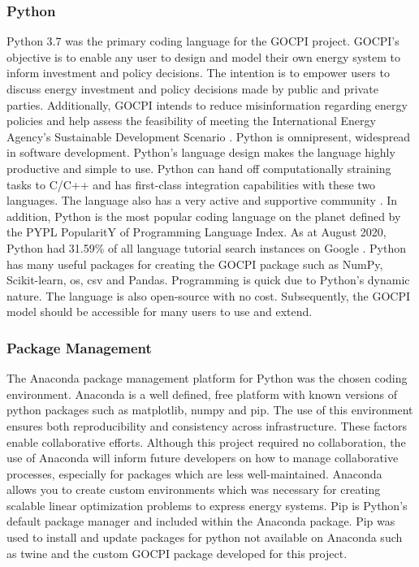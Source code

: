 \documentclass[12pt]{article}
\begin{document}
\subsubsection{Python}\label{python}
Python 3.7 was the primary coding language for the GOCPI project. 
GOCPI's objective is to enable any user to design and model their own energy system to inform investment and policy decisions.
The intention is to empower users to discuss energy investment and policy decisions made by public and private parties.
Additionally, GOCPI intends to reduce misinformation regarding energy policies and help assess the feasibility of meeting the International Energy Agency's Sustainable Development Scenario \cite{IEA_WEM}.
Python is omnipresent, widespread in software development. 
Python's language design makes the language highly productive and simple to use. 
Python can hand off computationally straining tasks to C/C++ and has first-class integration capabilities with these two languages.
The language also has a very active and supportive community \cite{Python_Features}.
In addition, Python is the most popular coding language on the planet defined by the PYPL PopularitY of Programming Language Index. As at August 2020, Python had 31.59\% of all language tutorial search instances on Google \cite{PYPL_Pop}.
Python has many useful packages for creating the GOCPI package such as NumPy, Scikit-learn, os, csv and Pandas. 
Programming is quick due to Python's dynamic nature.
The language is also open-source with no cost.
Subsequently, the GOCPI model should be accessible for many users to use and extend.

\subsubsection{Package Management}
The Anaconda package management platform for Python \cite{Anaconda} was the chosen coding environment.
Anaconda is a well defined, free platform with known versions of python packages such as matplotlib, numpy and pip.
The use of this environment ensures both reproducibility and consistency across infrastructure.
These factors enable collaborative efforts. 
Although this project required no collaboration, the use of Anaconda will inform future developers on how to manage collaborative processes, especially for packages
which are less well-maintained. Anaconda allows you to create custom environments which was necessary for creating scalable linear optimization problems to express energy systems.
Pip is Python's default package manager and included within the Anaconda package. 
Pip was used to install and update packages for python not available on Anaconda such as twine and the custom GOCPI package developed for this project.
\end{document}
